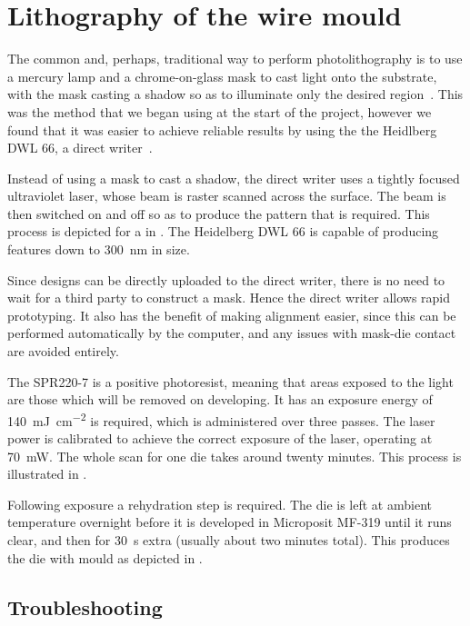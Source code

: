 \section{Lithography of the wire mould}

The common and, perhaps, traditional way to perform photolithography is to use
a mercury lamp and a chrome-on-glass mask to cast light onto the
substrate, with the mask casting a shadow so as to illuminate only the desired
region~\cite{Madou2002}. This was the method that we began using at the start of the
project, however we found that it was easier to achieve reliable results by
using the the Heidlberg DWL 66, a direct writer~\cite{}. 

Instead of using a mask to cast a shadow, the direct writer uses a tightly
focused ultraviolet laser, whose beam is raster scanned across the surface. The
beam is then switched on and off so as to produce the pattern that is required.
This process is depicted for a in . The Heidelberg
DWL 66 is capable of producing features down to \SI{300}{\nano\meter} in size.

Since designs can be directly uploaded to the direct writer, there is no need
to wait for a third party to construct a mask.  Hence the direct writer allows
rapid prototyping. It also has the benefit of making alignment easier, since
this can be performed automatically by the computer, and any issues with
mask-die contact are avoided entirely. 

The SPR220-7 is a positive photoresist, meaning that areas exposed to the light
are those which will be removed on developing. It has an exposure energy of
\SI{140}{\milli\joule\per\square\centi\meter} is required, which is
administered over three passes. The laser power is calibrated to achieve the
correct exposure of the laser, operating at \SI{70}{\milli\watt}. The
whole scan for one die takes around twenty minutes. This process is illustrated
in .

Following exposure a rehydration step is required. The die is left at ambient
temperature overnight before it is developed in Microposit MF-319 until it runs
clear, and then for \SI{30}{\second} extra (usually about two minutes total).
This produces the die with mould as depicted in
.

\subsection{Troubleshooting}

